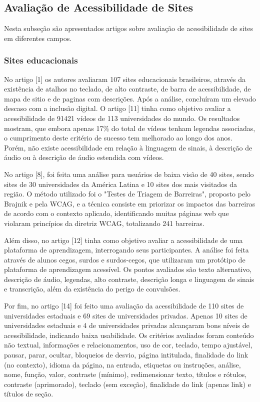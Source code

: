 \documentclass[a4paper]{article}
\begin{document}
\begin{titlepage}
\subsection{Avaliação de Acessibilidade de Sites}
Nesta subseção são apresentados artigos sobre avaliação de acessibilidade de sites em diferentes campos.

\subsubsection{Sites educacionais}

No artigo [1] os autores avaliaram 107 sites educacionais brasileiros, através da existência de atalhos no teclado, de alto contraste, de barra de acessibilidade, de mapa de sitio e de paginas com descrições. Após a análise, concluíram um elevado descaso com a inclusão digital. O artigo [11] tinha como objetivo avaliar a acessibilidade de 91421 vídeos de 113 universidades do mundo. Os resultados mostram, que embora apenas 17\% do total de vídeos tenham legendas associadas, o cumprimento deste critério de sucesso tem melhorado ao longo dos anos. Porém, não existe acessibilidade em relação à linguagem de sinais, à descrição de áudio ou à descrição de áudio estendida com vídeos.

No artigo [8], foi feita uma análise para usuários de baixa visão de 40 sites, sendo sites de 30 universidades da América Latina e 10 sites dos mais visitados da região. O método utilizado foi o "Testes de Triagem de Barreiras", proposto pelo Brajnik e pela WCAG, e a técnica consiste em priorizar os impactos das barreiras de acordo com o contexto aplicado, identificando muitas páginas web que violaram princípios da diretriz WCAG, totalizando 241 barreiras.

Além disso, no artigo [12] tinha como objetivo avaliar a acessibilidade de uma plataforma de aprendizagem, interrogando seus participantes. A análise foi feita através de alunos cegos, surdos e surdos-cegos, que utilizaram um protótipo de plataforma de aprendizagem acessível. Os pontos avaliados são texto alternativo, descrição de áudio, legendas, alto contraste, descrição longa e linguagem de sinais e transcrição, além da existência do perigo de convulsões. 

Por fim, no artigo [14] foi feito uma avaliação da acessibilidade de 110 sites de universidades estaduais e 69 sites de universidades privadas. Apenas 10 sites de universidades estaduais e 4 de universidades privadas alcançaram bons níveis de acessibilidade, indicando baixa usabilidade. Os critérios avaliados foram conteúdo não textual, informações e relacionamentos, uso de cor, teclado, tempo ajustável, pausar, parar, ocultar, bloqueios de desvio, página intitulada, finalidade do link (no contexto), idioma da página, na entrada, etiquetas ou instruções, análise, nome, função, valor, contraste (mínimo), redimensionar texto, títulos e rótulos, contraste (aprimorado), teclado (sem exceção), finalidade do link (apenas link) e títulos de seção.


\end{titlepage}
\end{document}
